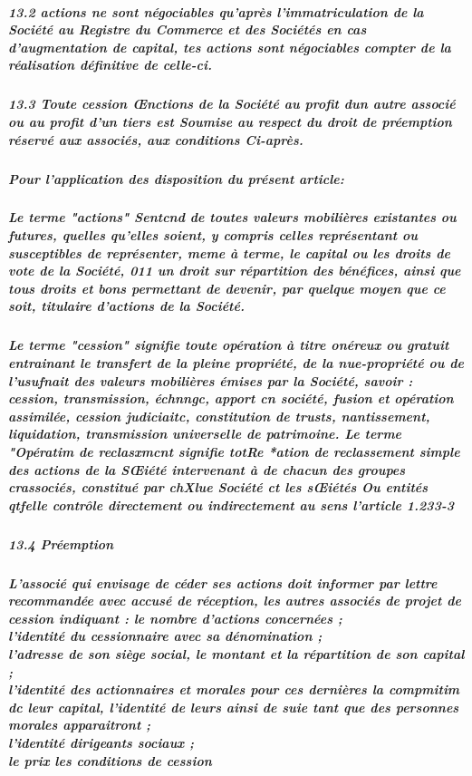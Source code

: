 \documentclass[a4paper, 11pt]{article}
\begin{document}
\subparagraph{
  13.2 actions ne sont négociables qu'après l'immatriculation de la Société au Registre du Commerce et des Sociétés en cas d'augmentation de capital, tes actions sont négociables compter de la réalisation définitive de celle-ci.
}

\subparagraph{
  13.3 Toute cession Œnctions de la Société au profit dun autre associé ou au profit d'un tiers est Soumise au respect du droit de préemption réservé aux associés, aux conditions Ci-après.
}

\subparagraph{
  Pour l'application des disposition du présent article:
}

\subparagraph{
  Le terme "actions" Sentcnd de toutes valeurs mobilières existantes ou futures, quelles qu'elles soient, y compris celles représentant ou susceptibles de représenter, meme à terme, le capital ou les droits de vote de la Société, 011 un droit sur répartition des bénéfices, ainsi que tous droits et bons permettant de devenir, par quelque moyen que ce soit, titulaire d'actions de la Société.
}

\subparagraph{
  Le terme "cession" signifie toute opération à titre onéreux ou gratuit entrainant le transfert de la pleine propriété, de la nue-propriété ou de l'usufnait des valeurs mobilières émises par la Société, savoir : cession, transmission, échnngc, apport cn société, fusion et opération assimilée, cession judiciaitc, constitution de trusts, nantissement, liquidation, transmission universelle de patrimoine. Le terme "Opératim de reclasxmcnt signifie totRe *ation de reclassement simple des actions de la SŒiété intervenant à de chacun des groupes crassociés, constitué par chXlue Société ct les sŒiétés Ou entités qtfelle contrôle directement ou indirectement au sens l'article 1.233-3
}

\subparagraph{
  13.4 Préemption
}

\subparagraph{
  L'associé qui envisage de céder ses actions doit informer par lettre recommandée avec accusé de réception, les autres associés de projet de cession indiquant :
  le nombre d'actions concernées ;\\
  l'identité du cessionnaire avec sa dénomination ;\\
  l'adresse de son siège social, le montant et la répartition de son capital ;\\
  l'identité des actionnaires et morales pour ces dernières la  compmitim dc leur capital, l'identité de leurs ainsi de suie tant que des personnes morales apparaitront ;\\
  l'identité dirigeants sociaux ;\\
  le prix les conditions de cession\\
}
\end{document}

